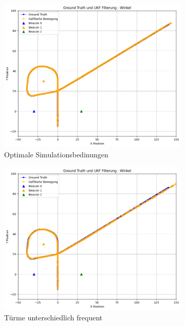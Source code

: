 \begin{figure}
    \begin{subfigure}{.333\textwidth}
        \centering
        \includegraphics[width=.9\linewidth]{Ergebnisse/plots_fahrten/winkel/winkel_const_vel_basic.png}  
        \caption{Optimale Simulationsbedinungen}
    \end{subfigure}    
    \begin{subfigure}{.333\textwidth}
        \centering
        \includegraphics[width=.9\linewidth]{Ergebnisse/plots_fahrten/winkel/winkel_const_vel_freq.png} 
        \caption{Türme unterschiedlich frequent}
    \end{subfigure}    
    \begin{subfigure}{.333\textwidth}

\end{subfigure}
\end{figure}
